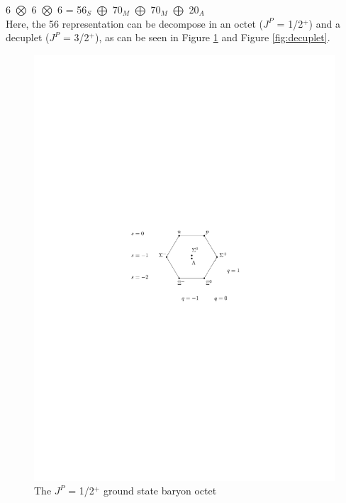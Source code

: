 6 $\bigotimes$ 6 $\bigotimes$ 6  =  56$_{S}$ $\bigoplus$ 70$_{M}$ $\bigoplus$ 70$_{M}$ $\bigoplus$ 20$_{A}$ \\

Here, the 56 representation can be decompose in an octet ($J^{P}$ = 1/2$^{+}$) and a decuplet ($J^{P}$ = 3/2$^{+}$), as can be seen in Figure \ref{fig:octet} and Figure \ref{fig:decuplet}.

\begin{figure}[htbp]
\begin{center}
\includegraphics[width=10.cm]{./Version1/FigChapter3/Octet}
\caption{ The $J^{P}$ = 1/2$^{+}$ ground state baryon octet}
\label{fig:octet}
\end{center}
\end{figure}

